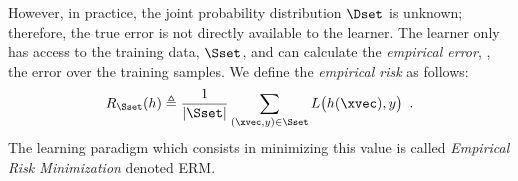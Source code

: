 However, in practice, the joint probability distribution $\Dset$ is unknown; therefore, the true error is not directly available to the learner.
The learner only has access to the training data, $\Sset$, and can calculate the \emph{empirical error}, \ie, the error over the training samples.
We define the \emph{empirical risk} as follows:
\begin{equation} \label{equation:ch2-empirical_risk}
  R_{\Sset}(h) \triangleq \frac{1}{|\Sset|} \sum_{(\xvec, y) \in \Sset} L\big( h(\xvec), y \big) \enspace.
\end{equation}
The learning paradigm which consists in minimizing this value is called \emph{Empirical Risk Minimization} denoted ERM.





